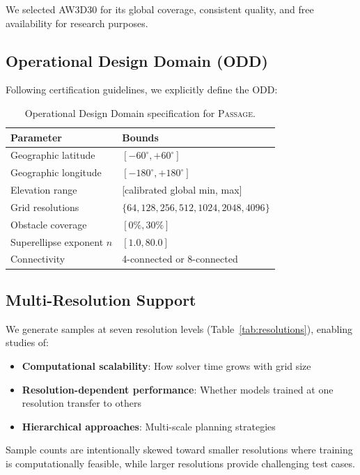 \documentclass{article}
\newcommand{\dataset}{\textsc{Passage}}
\begin{document}
We selected AW3D30 for its global coverage, consistent quality, and free availability for research purposes.

\subsection{Operational Design Domain (ODD)}

Following certification guidelines, we explicitly define the ODD:

\begin{table}[h]
\centering
\caption{Operational Design Domain specification for \dataset{}.}
\label{tab:odd}
\small
\begin{tabular}{ll}
\toprule
\textbf{Parameter} & \textbf{Bounds} \\
\midrule
Geographic latitude & $[-60^\circ, +60^\circ]$ \\
Geographic longitude & $[-180^\circ, +180^\circ]$ \\
Elevation range & [calibrated global min, max] \\
Grid resolutions & $\{64, 128, 256, 512, 1024, 2048, 4096\}$ \\
Obstacle coverage & $[0\%, 30\%]$ \\
Superellipse exponent $n$ & $[1.0, 80.0]$ \\
Connectivity & 4-connected or 8-connected \\
\bottomrule
\end{tabular}
\end{table}

\subsection{Multi-Resolution Support}

We generate samples at seven resolution levels (Table~\ref{tab:resolutions}), enabling studies of:
\begin{itemize}[noitemsep]
    \item \textbf{Computational scalability}: How solver time grows with grid size
    \item \textbf{Resolution-dependent performance}: Whether models trained at one resolution transfer to others
    \item \textbf{Hierarchical approaches}: Multi-scale planning strategies
\end{itemize}

Sample counts are intentionally skewed toward smaller resolutions where training is computationally feasible, while larger resolutions provide challenging test cases.
\end{document}
